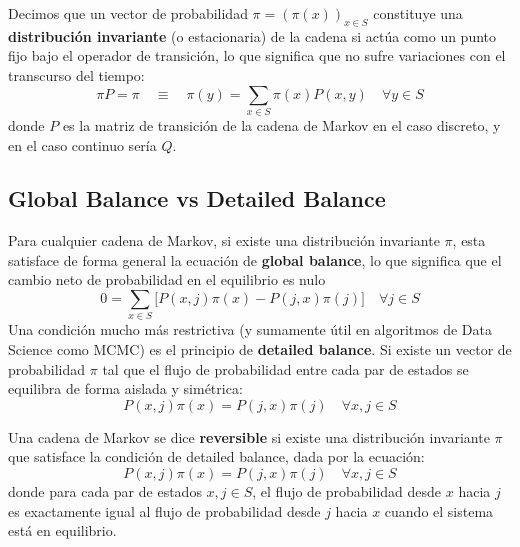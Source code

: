 \documentclass[10pt]{book}
\begin{document}
\begin{definicion}
    Decimos que un vector de probabilidad $\pi = (\pi(x))_{x \in S}$ constituye una \textbf{distribución invariante} (o estacionaria) de la cadena si actúa como un punto fijo bajo el operador de transición, lo que significa que no sufre variaciones con el transcurso del tiempo:
    \begin{equation*}
        \pi P=\pi \quad \equiv \quad \pi(y) = \sum_{x \in S} \pi(x) P(x, y) \quad \forall y \in S
    \end{equation*}
    donde $P$ es la matriz de transición de la cadena de Markov en el caso discreto, y en el caso continuo sería $Q$.
\end{definicion}




\subsection{Global Balance vs Detailed Balance}
\noindent
\begin{definicion}
    Para cualquier cadena de Markov, si existe una distribución invariante $\pi$, esta satisface de forma general la ecuación de \textbf{global balance}, lo que significa que el cambio neto de probabilidad en el equilibrio es nulo
    \begin{equation*}
        0 = \sum_{x \in S} \big[ P(x, j)\pi(x) - P(j, x)\pi(j) \big] \quad \forall j \in S
    \end{equation*}
    Una condición mucho más restrictiva (y sumamente útil en algoritmos de Data Science como MCMC) es el principio de \textbf{detailed balance}. Si existe un vector de probabilidad $\pi$ tal que el flujo de probabilidad entre cada par de estados se equilibra de forma aislada y simétrica:
    \begin{equation*}
        P(x, j)\pi(x) = P(j, x)\pi(j) \quad \forall x, j \in S
    \end{equation*}
\end{definicion}

\begin{definicion}
    Una cadena de Markov se dice \textbf{reversible} si existe una distribución invariante $\pi$ que satisface la condición de detailed balance, dada por la ecuación:
    \begin{equation*}
        P(x, j)\pi(x) = P(j, x)\pi(j) \quad \forall x, j \in S
    \end{equation*}
    donde para cada par de estados $x, j \in S$, el flujo de probabilidad desde $x$ hacia $j$ es exactamente igual al flujo de probabilidad desde $j$ hacia $x$ cuando el sistema está en equilibrio.
\end{definicion}
\end{document}
